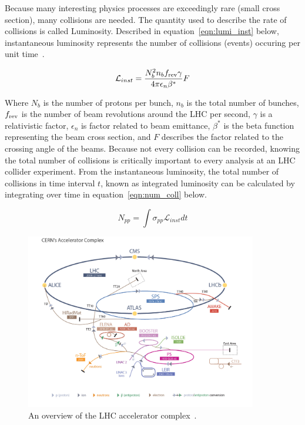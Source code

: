 \noindent Because many interesting physics processes are exceedingly rare (small cross section), many collisions
are needed. The quantity used to describe the rate of collisions is called Luminosity.
Described in equation~\ref{eqn:lumi_inst} below, instantaneous luminosity represents the number of collisions (events) occuring per unit time~\cite{lhc_bluebook}.

\begin{equation}
\label{eqn:lumi_inst}
\mathcal{L}_{inst} = \frac{N_{b}^{2}n_{b}f_{\textnormal{rev}}\gamma}{4\pi \epsilon_{n} \beta^{*}}F
\end{equation}

Where $N_{b}$ is the number of protons per bunch, $n_{b}$ is the total number of bunches, $f_{\textnormal{rev}}$ is the number of beam revolutions around the LHC per
second, $\gamma$ is a relativistic factor, $\epsilon_{n}$ is factor related to beam emittance, $\beta^{*}$ is the beta function representing the beam cross section, and
$F$ describes the factor related to the crossing angle of the beams. Because not every collision can be recorded, knowing the total number of collisions is critically important
to every analysis at an LHC collider experiment. From the instantaneous luminosity, the total number of collisions in time interval $t$, known as integrated luminosity
can be calculated by integrating over time in equation~\ref{eqn:num_coll} below. 

\begin{equation}
\label{eqn:num_coll}
N_{pp} = \int \sigma_{pp}\mathcal{L}_{inst}dt 
\end{equation}


\begin{figure}[hbtp]
 \begin{center}
   \includegraphics[width=0.9\textwidth]{ch3_figs/lhc_complex.pdf}
   \caption[Overview of the LHC accelerator complex]{An overview of the LHC accelerator complex~\cite{lhcfig}.}
   \label{fig:lhc_complex}
 \end{center}
\end{figure}


